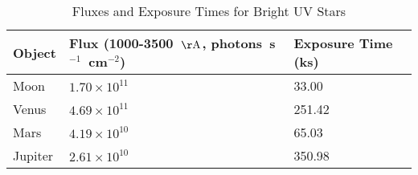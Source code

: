 \begin{table*}
\caption{Fluxes and Exposure Times for Bright UV Stars\label{tab:ss_fluxes}}
\begin{center}
\begin{tabular}{lll}
\hline
\hline
Object & Flux (1000-3500~${\rm \AA}$, photons~s$^{-1}$~cm$^{-2}$) & Exposure Time (ks) \\
\hline
Moon & $1.70 \times 10^{11}$ & 33.00 \\
Venus & $4.69 \times 10^{11}$ & 251.42 \\
Mars & $4.19 \times 10^{10}$ & 65.03 \\
Jupiter & $2.61 \times 10^{10}$ & 350.98 \\
\hline
\end{tabular}
\end{center}
\end{table*}
